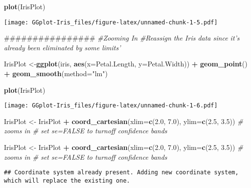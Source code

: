 \documentclass[]{article}
\newenvironment{Shaded}{\begin{snugshade}}{\end{snugshade}}
\newcommand{\KeywordTok}[1]{\textcolor[rgb]{0.13,0.29,0.53}{\textbf{#1}}}
\newcommand{\DataTypeTok}[1]{\textcolor[rgb]{0.13,0.29,0.53}{#1}}
\newcommand{\FloatTok}[1]{\textcolor[rgb]{0.00,0.00,0.81}{#1}}
\newcommand{\StringTok}[1]{\textcolor[rgb]{0.31,0.60,0.02}{#1}}
\newcommand{\CommentTok}[1]{\textcolor[rgb]{0.56,0.35,0.01}{\textit{#1}}}
\newcommand{\OperatorTok}[1]{\textcolor[rgb]{0.81,0.36,0.00}{\textbf{#1}}}
\newcommand{\NormalTok}[1]{#1}
\begin{document}
\begin{Shaded}
\begin{Highlighting}[]
\KeywordTok{plot}\NormalTok{(IrisPlot)}
\end{Highlighting}
\end{Shaded}

\texttt{[image: GGplot-Iris\_files/figure-latex/unnamed-chunk-1-5.pdf]}

\begin{Shaded}
\begin{Highlighting}[]
\NormalTok{################}
\CommentTok{#Zooming In}
\CommentTok{#Reassign the Iris data since it's already been eliminated by some limits'}

\NormalTok{IrisPlot <-}\KeywordTok{ggplot}\NormalTok{(iris, }\KeywordTok{aes}\NormalTok{(}\DataTypeTok{x=}\NormalTok{Petal.Length, }\DataTypeTok{y=}\NormalTok{Petal.Width))   }\OperatorTok{+}\StringTok{  }\KeywordTok{geom_point}\NormalTok{() }\OperatorTok{+}\StringTok{  }\KeywordTok{geom_smooth}\NormalTok{(}\DataTypeTok{method=}\StringTok{"lm"}\NormalTok{)}

\KeywordTok{plot}\NormalTok{(IrisPlot)}
\end{Highlighting}
\end{Shaded}

\texttt{[image: GGplot-Iris\_files/figure-latex/unnamed-chunk-1-6.pdf]}

\begin{Shaded}
\begin{Highlighting}[]
\NormalTok{IrisPlot <-}\StringTok{ }\NormalTok{IrisPlot }\OperatorTok{+}\StringTok{ }\KeywordTok{coord_cartesian}\NormalTok{(}\DataTypeTok{xlim=}\KeywordTok{c}\NormalTok{(}\FloatTok{2.0}\NormalTok{, }\FloatTok{7.0}\NormalTok{), }\DataTypeTok{ylim=}\KeywordTok{c}\NormalTok{(}\FloatTok{2.5}\NormalTok{, }\FloatTok{3.5}\NormalTok{))  }\CommentTok{# zooms in   # set se=FALSE to turnoff confidence bands}

\NormalTok{IrisPlot <-}\StringTok{ }\NormalTok{IrisPlot }\OperatorTok{+}\StringTok{ }\KeywordTok{coord_cartesian}\NormalTok{(}\DataTypeTok{xlim=}\KeywordTok{c}\NormalTok{(}\FloatTok{2.0}\NormalTok{, }\FloatTok{7.0}\NormalTok{), }\DataTypeTok{ylim=}\KeywordTok{c}\NormalTok{(}\FloatTok{2.5}\NormalTok{, }\FloatTok{3.5}\NormalTok{))  }\CommentTok{# zooms in   # set se=FALSE to turnoff confidence bands}
\end{Highlighting}
\end{Shaded}

\begin{verbatim}
## Coordinate system already present. Adding new coordinate system, which will replace the existing one.
\end{verbatim}
\end{document}

